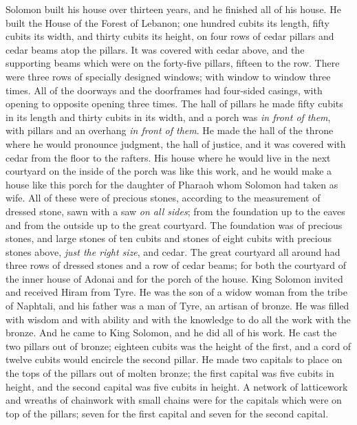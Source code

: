 \begin{biblechapter} %
 Solomon built his house over thirteen years, and he finished all of his house.
\verse He built the House of the Forest of Lebanon; one hundred cubits its length, fifty cubits its width, and thirty cubits its height, on four rows of cedar pillars and cedar beams atop the pillars.
\verse It was covered with cedar above, and the supporting beams which were on the forty-five pillars, fifteen to the row.
\verse There were three rows of specially designed windows; with window to window three times.
\verse All of the doorways and the doorframes had four-sided casings, with opening to opposite opening three times.
\verse The hall of pillars he made fifty cubits in its length and thirty cubits in its width, and a porch was \textit{in front of them}, with pillars and an overhang \textit{in front of them}.
\verse He made the hall of the throne where he would pronounce judgment, the hall of justice, and it was covered with cedar from the floor to the rafters.
\verse His house where he would live in the next courtyard on the inside of the porch was like this work, and he would make a house like this porch for the daughter of Pharaoh whom Solomon had taken as wife.
\verse All of these were of precious stones, according to the measurement of dressed stone, sawn with a saw \textit{on all sides}; from the foundation up to the eaves and from the outside up to the great courtyard.
\verse The foundation was of precious stones, and large stones of ten cubits and stones of eight cubits
\verse with precious stones above, \textit{just the right size}, and cedar.
\verse The great courtyard all around had three rows of dressed stones and a row of cedar beams; for both the courtyard of the inner house of Adonai and for the porch of the house.
\verse King Solomon invited and received Hiram from Tyre.
\verse He was the son of a widow woman from the tribe of Naphtali, and his father was a man of Tyre, an artisan of bronze. He was filled with wisdom and with ability and with the knowledge to do all the work with the bronze. And he came to King Solomon, and he did all of his work.
\verse He cast the two pillars out of bronze; eighteen cubits was the height of the first, and a cord of twelve cubits would encircle the second pillar.
\verse He made two capitals to place on the tops of the pillars out of molten bronze; the first capital was five cubits in height, and the second capital was five cubits in height.
\verse A network of latticework and wreaths of chainwork with small chains were for the capitals which were on top of the pillars; seven for the first capital and seven for the second capital.

\end{biblechapter}
